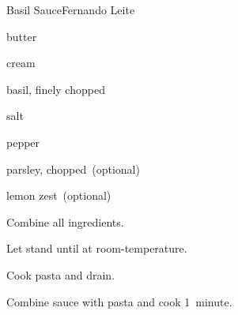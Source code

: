 \begin{recipe}{Basil Sauce}{Fernando Leite}{}

\begin{ingredients}
\item \lbs{\quarter} butter
\item \C{\half} 
\item {} cream
\item basil, finely chopped
\item salt
\item pepper
\item parsley, chopped~(optional)
\item lemon zest~(optional)
\end{ingredients}

\begin{directions}
\item Combine all ingredients.
\item Let stand until at room-temperature.
\item Cook pasta and drain.
\item Combine sauce with pasta and cook 1~minute.
\end{directions}

\end{recipe}
